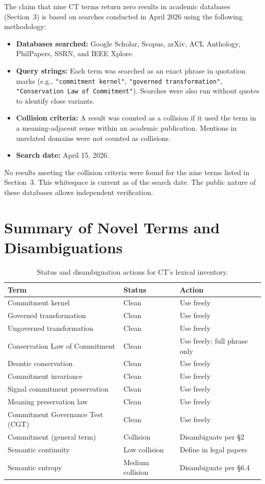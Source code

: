 \documentclass[11pt,a4paper]{article}
\begin{document}
The claim that nine CT terms return zero results in academic databases (Section~3) is based on searches conducted in April 2026 using the following methodology:

\begin{itemize}[leftmargin=*,nosep]
    \item \textbf{Databases searched:} Google Scholar, Scopus, arXiv, ACL Anthology, PhilPapers, SSRN, and IEEE Xplore.
    \item \textbf{Query strings:} Each term was searched as an exact phrase in quotation marks (e.g., \texttt{"commitment kernel"}, \texttt{"governed transformation"}, \texttt{"Conservation Law of Commitment"}). Searches were also run without quotes to identify close variants.
    \item \textbf{Collision criteria:} A result was counted as a collision if it used the term in a meaning-adjacent sense within an academic publication. Mentions in unrelated domains were not counted as collisions.
    \item \textbf{Search date:} April 15, 2026.
\end{itemize}

No results meeting the collision criteria were found for the nine terms listed in Section~3. This whitespace is current as of the search date. The public nature of these databases allows independent verification.

\section{Summary of Novel Terms and Disambiguations}

\begin{table}[htbp]
\centering
\small
\renewcommand{\arraystretch}{1.3}
\begin{tabular}{@{}lll@{}}
\toprule
\textbf{Term} & \textbf{Status} & \textbf{Action} \\
\midrule
Commitment kernel & Clean & Use freely \\
Governed transformation & Clean & Use freely \\
Ungoverned transformation & Clean & Use freely \\
Conservation Law of Commitment & Clean & Use freely; full phrase only \\
Deontic conservation & Clean & Use freely \\
Commitment invariance & Clean & Use freely \\
Signal commitment preservation & Clean & Use freely \\
Meaning preservation law & Clean & Use freely \\
Commitment Governance Test (CGT) & Clean & Use freely \\
Commitment (general term) & Collision & Disambiguate per \S2 \\
Semantic continuity & Low collision & Define in legal papers \\
Semantic entropy & Medium collision & Disambiguate per \S6.4 \\
\bottomrule
\end{tabular}
\caption{Status and disambiguation actions for CT's lexical inventory.}
\end{table}
\end{document}
